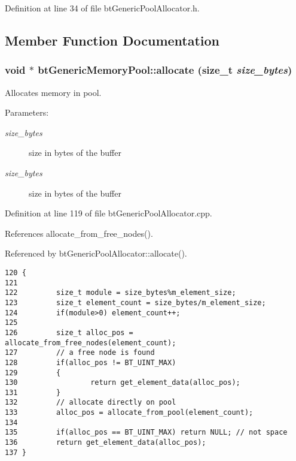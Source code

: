 Definition at line 34 of file btGenericPoolAllocator.h.

\subsection{Member Function Documentation}
\hypertarget{classbt_generic_memory_pool_cd47d75d6fbd7dbf6f0d7849e0bd9ec1}{
\subsubsection[allocate]{\setlength{\rightskip}{0pt plus 5cm}void $\ast$ btGenericMemoryPool::allocate (size\_\-t {\em size\_\-bytes})}}
\label{classbt_generic_memory_pool_cd47d75d6fbd7dbf6f0d7849e0bd9ec1}


Allocates memory in pool. 

\begin{Desc}
\item[Parameters:]
\begin{description}
\item[{\em size\_\-bytes}]size in bytes of the buffer\item[{\em size\_\-bytes}]size in bytes of the buffer \end{description}
\end{Desc}


Definition at line 119 of file btGenericPoolAllocator.cpp.

References allocate\_\-from\_\-free\_\-nodes().

Referenced by btGenericPoolAllocator::allocate().

\begin{Code}\begin{verbatim}120 {
121 
122         size_t module = size_bytes%m_element_size;
123         size_t element_count = size_bytes/m_element_size;
124         if(module>0) element_count++;
125 
126         size_t alloc_pos = allocate_from_free_nodes(element_count);
127         // a free node is found
128         if(alloc_pos != BT_UINT_MAX)
129         {
130                 return get_element_data(alloc_pos);
131         }
132         // allocate directly on pool
133         alloc_pos = allocate_from_pool(element_count);
134 
135         if(alloc_pos == BT_UINT_MAX) return NULL; // not space
136         return get_element_data(alloc_pos);
137 }
\end{verbatim}
\end{Code}




